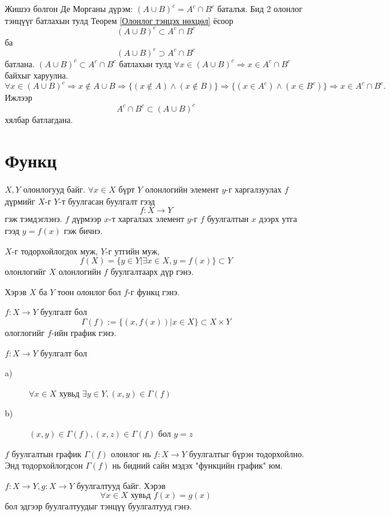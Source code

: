 \begin{prof}
    Жишээ болгон Де Морганы дүрэм: $(A\cup B)^c=A^c\cap B^c$ баталъя. 
    Бид 2 олонлог тэнцүүг батлахын тулд Теорем \ref{Олонлог тэнцэх нөхцөл} ёсоор $$(A\cup B)^c\subset A^c\cap B^c$$ ба $$(A\cup B)^c\supset A^c\cap B^c$$ батлана. $(A\cup B)^c\subset A^c\cap B^c$ батлахын тулд 
 $\forall x\in (A\cup B)^c\Rightarrow x\in A^c\cap B^c$ байхыг харуулна. 
 $$\forall x\in (A\cup B)^c\Rightarrow x\notin A\cup B \Rightarrow \{(x\notin A) \land (x\notin B)\}\Rightarrow \{(x\in A^c) \land (x\in B^c)\}\Rightarrow x\in A^c\cap B^c.$$ Ижлээр 
 $$ A^c\cap B^c\subset (A\cup B)^c$$ хялбар батлагдана.
\end{prof}
\section{Функц}
\begin{definition}[Функц]
$X , Y$ олонлогууд байг. $\forall x\in X$ бүрт $Y$ олонлогийн элемент $y$-г харгалзуулах $f$ дүрмийг $X$-г $Y$-т буулгасан буулгалт гээд  $$f:X\to Y$$ гэж тэмдэглэнэ. $f$ дүрмээр $x$-т харгалзах элемент $y$-г $f$ буулгалтын $x$ дээрх утга гээд $y=f(x)$ гэж бичнэ. 


$X$-г тодорхойлогдох муж, $Y$-г утгийн муж, 
$$f(X)=\{y\in Y|\exists x\in X, y=f(x)\}\subset Y$$ олонлогийг $X$ олонлогийн $f$ буулгалтаарх дүр гэнэ.  
\end{definition}
Хэрэв $X$ ба $Y$ тоон олонлог бол   $f$-г функц гэнэ.

\begin{definition}[График]
 $f:X\to Y$ буулгалт бол 
 $$\Gamma(f):=\{(x,f(x))|x\in X\}\subset X\times Y$$ ологлогийг $f$-ийн график гэнэ.  
\end{definition}
\begin{theorem}\label{fun:grap}
 $f:X\to Y$ буулгалт бол 
\begin{description}
\item[a)] $\forall x\in X$ хувьд $\exists y\in Y , (x,y)\in \Gamma(f)$
\item[b)] $(x,y)\in \Gamma(f) , (x,z)\in \Gamma(f)$ бол $y=z$
\end{description}
\end{theorem}
 $f$ буулгалтын график $ \Gamma(f)$ олонлог нь  $f:X\to Y$ буулгалтыг бүрэн тодорхойлно. Энд тодорхойлогдсон $\Gamma(f)$ нь бидний сайн мэдэх "функцийн график" юм. 
\begin{definition}
$f:X\to Y , g:X\to Y$ буулгалтууд байг. Хэрэв $$\forall x\in X \text{ хувьд } f(x)=g(x)$$
 бол эдгээр буулгалтуудыг тэнцүү буулгалтууд гэнэ. 
\end{definition}

